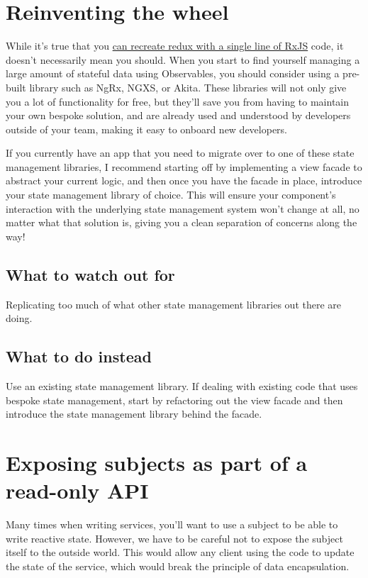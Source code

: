 \section{Reinventing the wheel}
While it’s true that you \href{http://rudiyardley.com/redux-single-line-of-code-rxjs/}{can recreate redux with a single line of RxJS} code, it doesn’t necessarily mean you should. When you start to find yourself managing a large amount of stateful data using Observables, you should consider using a pre-built library such as NgRx, NGXS, or Akita. These libraries will not only give you a lot of functionality for free, but they’ll save you from having to maintain your own bespoke solution, and are already used and understood by developers outside of your team, making it easy to onboard new developers.

If you currently have an app that you need to migrate over to one of these state management libraries, I recommend starting off by implementing a view facade to abstract your current logic, and then once you have the facade in place, introduce your state management library of choice. This will ensure your component’s interaction with the underlying state management system won’t change at all, no matter what that solution is, giving you a clean separation of concerns along the way!

\subsection{What to watch out for}
Replicating too much of what other state management libraries out there are doing.

\subsection{What to do instead}
Use an existing state management library. If dealing with existing code that uses bespoke state management, start by refactoring out the view facade and then introduce the state management library behind the facade.

\section{Exposing subjects as part of a read-only API}
Many times when writing services, you’ll want to use a subject to be able to write reactive state. However, we have to be careful not to expose the subject itself to the outside world. This would allow any client using the code to update the state of the service, which would break the principle of data encapsulation.

